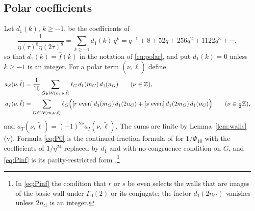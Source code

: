 \subsection{Polar coefficients}
Let $d_1(k)$, $k\ge-1$, be the coefficients of
\begin{equation}\label{eq:d1}
\frac1{\eta(\tau)^8\eta(2\tau)^8}=\sum_{k\ge-1}d_1(k)\,q^k=q^{-1}+8+52q+256q^2+1122q^3+\cdots,
\end{equation}
so that $d_1(k)=\hat f(k)$ in the notation of \eqref{eq:polar}, and put $d_1(k)=0$ unless $k\ge-1$ is an integer. For a polar term $(\nu,\tilde\ell)$ define
\begin{align}
a_S(\nu,\tilde\ell)&=\frac1{16}\sum_{G\in\mathcal W(m,\nu,\tilde\ell)}\ell_G\,d_1(m_G)\,d_1(n_G)\qquad(\nu\in\ZZ),\label{eq:P0}\\
a_I(\nu,\tilde\ell)&=\sum_{G\in\mathcal W(m,\nu,\tilde\ell)}\ell_G\Big([r\ \text{even}]\,d_1(m_G)\,d_1(2n_G)+[s\ \text{even}]\,d_1(2m_G)\,d_1(n_G)\Big)\qquad(\nu\in\tfrac12\ZZ),\label{eq:Pinf}
\end{align}
and $a_T(\nu,\tilde\ell)=(-1)^{2\nu}a_I(\nu,\tilde\ell)$. The sums are finite by Lemma~\ref{lem:walls}(v). Formula \eqref{eq:P0} is the continued-fraction formula of \cite[(2.43)]{CNR21} for $1/\Phi_{10}$ with the coefficients of $1/\eta^{24}$ replaced by $d_1$ and with no congruence condition on $G$, and \eqref{eq:Pinf} is its parity-restricted form \cite[(4.21)]{CNR21}.\footnote{In \eqref{eq:Pinf} the condition that $r$ or $s$ be even selects the walls that are images of the basic wall under $\Gamma_0(2)$ or its conjugate; the factor $d_1(2n_G)$ vanishes unless $2n_G$ is an integer.}
